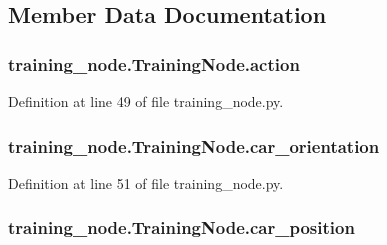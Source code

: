 \subsection{Member Data Documentation}
\subsubsection[{\texorpdfstring{action}{action}}]{\setlength{\rightskip}{0pt plus 5cm}training\+\_\+node.\+Training\+Node.\+action}\hypertarget{classtraining__node_1_1_training_node_a9aca91d2739de83e292f046f6047c193}{}\label{classtraining__node_1_1_training_node_a9aca91d2739de83e292f046f6047c193}


Definition at line 49 of file training\+\_\+node.\+py.

\subsubsection[{\texorpdfstring{car\+\_\+orientation}{car_orientation}}]{\setlength{\rightskip}{0pt plus 5cm}training\+\_\+node.\+Training\+Node.\+car\+\_\+orientation}\hypertarget{classtraining__node_1_1_training_node_aea2d9421fd831521afbfa48a1debb27c}{}\label{classtraining__node_1_1_training_node_aea2d9421fd831521afbfa48a1debb27c}


Definition at line 51 of file training\+\_\+node.\+py.

\subsubsection[{\texorpdfstring{car\+\_\+position}{car_position}}]{\setlength{\rightskip}{0pt plus 5cm}training\+\_\+node.\+Training\+Node.\+car\+\_\+position}\hypertarget{classtraining__node_1_1_training_node_ac89f63234a29b8591b0dc11f31c08b46}{}\label{classtraining__node_1_1_training_node_ac89f63234a29b8591b0dc11f31c08b46}


